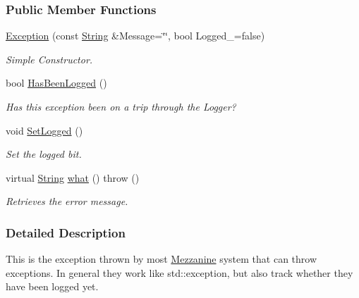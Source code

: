 \subsubsection*{Public Member Functions}
\begin{DoxyCompactItemize}
\item 
\hyperlink{classMezzanine_1_1Exception_ad8659eac607c0e9138be934281b4102d}{Exception} (const \hyperlink{namespaceMezzanine_acf9fcc130e6ebf08e3d8491aebcf1c86}{String} \&Message=\char`\"{}\char`\"{}, bool Logged\_\-=false)
\begin{DoxyCompactList}\small\item\em Simple Constructor. \item\end{DoxyCompactList}\item 
bool \hyperlink{classMezzanine_1_1Exception_a642c76c7148c92b09802a55600359d3c}{HasBeenLogged} ()
\begin{DoxyCompactList}\small\item\em Has this exception been on a trip through the Logger? \item\end{DoxyCompactList}\item 
\hypertarget{classMezzanine_1_1Exception_a574150adbe4f949a5668640a7225ca8c}{
void \hyperlink{classMezzanine_1_1Exception_a574150adbe4f949a5668640a7225ca8c}{SetLogged} ()}
\label{classMezzanine_1_1Exception_a574150adbe4f949a5668640a7225ca8c}

\begin{DoxyCompactList}\small\item\em Set the logged bit. \item\end{DoxyCompactList}\item 
virtual \hyperlink{namespaceMezzanine_acf9fcc130e6ebf08e3d8491aebcf1c86}{String} \hyperlink{classMezzanine_1_1Exception_adfca1d69742135b428879136456e1126}{what} ()  throw ()
\begin{DoxyCompactList}\small\item\em Retrieves the error message. \item\end{DoxyCompactList}\end{DoxyCompactItemize}


\subsubsection{Detailed Description}
This is the exception thrown by most \hyperlink{namespaceMezzanine}{Mezzanine} system that can throw exceptions. In general they work like std::exception, but also track whether they have been logged yet. 

